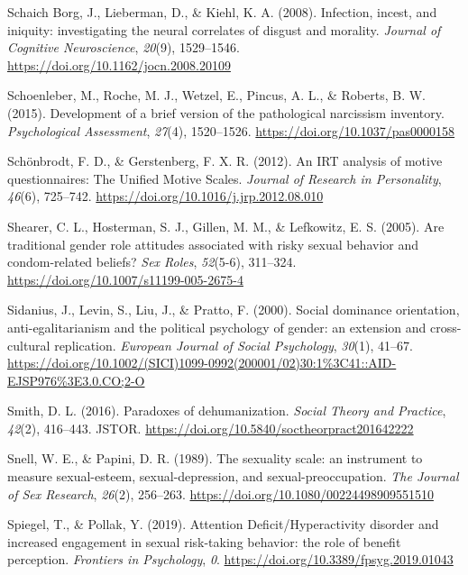 \documentclass[
  donotrepeattitle,doc, 12pt, a4paper,floatsintext]{apa7}
\newlength{\cslhangindent}
\newlength{\cslentryspacingunit} %
\newenvironment{CSLReferences}[2] %
 {%
  \setlength{\parindent}{0pt}
  \ifodd #1
  \let\oldpar\par
  \def\par{\hangindent=\cslhangindent\oldpar}
  \fi
  \setlength{\parskip}{#2\cslentryspacingunit}
 }%
 {}
\begin{document}
\begin{CSLReferences}{1}{0}
\leavevmode{}%
Schaich Borg, J., Lieberman, D., \& Kiehl, K. A. (2008). Infection, incest, and iniquity: investigating the neural correlates of disgust and morality. \emph{Journal of Cognitive Neuroscience}, \emph{20}(9), 1529--1546. \url{https://doi.org/10.1162/jocn.2008.20109}

\leavevmode{}%
Schoenleber, M., Roche, M. J., Wetzel, E., Pincus, A. L., \& Roberts, B. W. (2015). Development of a brief version of the pathological narcissism inventory. \emph{Psychological Assessment}, \emph{27}(4), 1520--1526. \url{https://doi.org/10.1037/pas0000158}

\leavevmode{}%
Schönbrodt, F. D., \& Gerstenberg, F. X. R. (2012). An IRT analysis of motive questionnaires: The Unified Motive Scales. \emph{Journal of Research in Personality}, \emph{46}(6), 725--742. \url{https://doi.org/10.1016/j.jrp.2012.08.010}

\leavevmode{}%
Shearer, C. L., Hosterman, S. J., Gillen, M. M., \& Lefkowitz, E. S. (2005). Are traditional gender role attitudes associated with risky sexual behavior and condom-related beliefs? \emph{Sex Roles}, \emph{52}(5-6), 311--324. \url{https://doi.org/10.1007/s11199-005-2675-4}

\leavevmode{}%
Sidanius, J., Levin, S., Liu, J., \& Pratto, F. (2000). Social dominance orientation, anti-egalitarianism and the political psychology of gender: an extension and cross-cultural replication. \emph{European Journal of Social Psychology}, \emph{30}(1), 41--67. \url{https://doi.org/10.1002/(SICI)1099-0992(200001/02)30:1\%3C41::AID-EJSP976\%3E3.0.CO;2-O}

\leavevmode{}%
Smith, D. L. (2016). Paradoxes of dehumanization. \emph{Social Theory and Practice}, \emph{42}(2), 416--443. JSTOR. \url{https://doi.org/10.5840/soctheorpract201642222}

\leavevmode{}%
Snell, W. E., \& Papini, D. R. (1989). The sexuality scale: an instrument to measure sexual-esteem, sexual-depression, and sexual-preoccupation. \emph{The Journal of Sex Research}, \emph{26}(2), 256--263. \url{https://doi.org/10.1080/00224498909551510}

\leavevmode{}%
Spiegel, T., \& Pollak, Y. (2019). Attention Deficit/Hyperactivity disorder and increased engagement in sexual risk-taking behavior: the role of benefit perception. \emph{Frontiers in Psychology}, \emph{0}. \url{https://doi.org/10.3389/fpsyg.2019.01043}


\end{CSLReferences}
\end{document}
